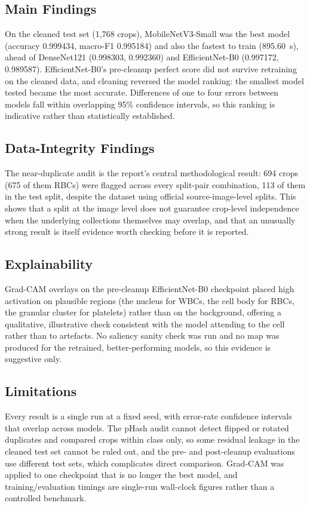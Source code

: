 \documentclass[11pt,a4paper]{article}
\begin{document}
\subsection{Main Findings}

On the cleaned test set (1,768 crops), MobileNetV3-Small was the best model (accuracy 0.999434, macro-F1 0.995184) and also the fastest to train (895.60~s), ahead of DenseNet121 (0.998303, 0.992360) and EfficientNet-B0 (0.997172, 0.989587). EfficientNet-B0's pre-cleanup perfect score did not survive retraining on the cleaned data, and cleaning reversed the model ranking: the smallest model tested became the most accurate. Differences of one to four errors between models fall within overlapping 95\% confidence intervals, so this ranking is indicative rather than statistically established.

\subsection{Data-Integrity Findings}

The near-duplicate audit is the report's central methodological result: 694 crops (675 of them RBCs) were flagged across every split-pair combination, 113 of them in the test split, despite the dataset using official source-image-level splits. This shows that a split at the image level does not guarantee crop-level independence when the underlying collections themselves may overlap, and that an unusually strong result is itself evidence worth checking before it is reported.

\subsection{Explainability}

Grad-CAM overlays on the pre-cleanup EfficientNet-B0 checkpoint placed high activation on plausible regions (the nucleus for WBCs, the cell body for RBCs, the granular cluster for platelets) rather than on the background, offering a qualitative, illustrative check consistent with the model attending to the cell rather than to artefacts. No saliency sanity check was run and no map was produced for the retrained, better-performing models, so this evidence is suggestive only.

\subsection{Limitations}

Every result is a single run at a fixed seed, with error-rate confidence intervals that overlap across models. The pHash audit cannot detect flipped or rotated duplicates and compared crops within class only, so some residual leakage in the cleaned test set cannot be ruled out, and the pre- and post-cleanup evaluations use different test sets, which complicates direct comparison. Grad-CAM was applied to one checkpoint that is no longer the best model, and training/evaluation timings are single-run wall-clock figures rather than a controlled benchmark.
\end{document}
